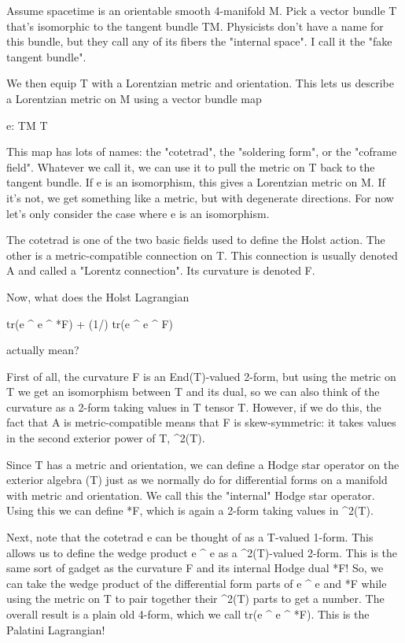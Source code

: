 Assume spacetime is an orientable smooth 4-manifold M.  Pick a vector
bundle T that's isomorphic to the tangent bundle TM.  Physicists don't
have a name for this bundle, but they call any of its fibers the
"internal space".  I call it the "fake tangent bundle".

We then equip T with a Lorentzian metric and orientation.  This lets
us describe a Lorentzian metric on M using a vector bundle map

e: TM \to  T  

This map has lots of names: the "cotetrad", the
"soldering form", or the "coframe field".
Whatever we call it, we can use it to pull the metric on T back to the
tangent bundle. If e is an isomorphism, this gives a Lorentzian metric
on M.  If it's not, we get something like a metric, but with
degenerate directions.  For now let's only consider the case where e
is an isomorphism.

The cotetrad is one of the two basic fields used to define the Holst
action.  The other is a metric-compatible connection on T.  This
connection is usually denoted A and called a "Lorentz
connection".  Its curvature is denoted F.

Now, what does the Holst Lagrangian

tr(e ^ e ^ *F) + (1/\gamma ) tr(e ^ e ^ F)

actually mean?  

First of all, the curvature F is an End(T)-valued 2-form, but using
the metric on T we get an isomorphism between T and its dual, so we
can also think of the curvature as a 2-form taking values in T tensor
T. However, if we do this, the fact that A is metric-compatible means
that F is skew-symmetric: it takes values in the second exterior power
of T, \Lambda ^{2}(T).

Since T has a metric and orientation, we can define a Hodge star
operator on the exterior algebra \Lambda (T) just as we normally do for
differential forms on a manifold with metric and orientation.  We call
this the "internal" Hodge star operator.  Using this we can define *F,
which is again a 2-form taking values in \Lambda ^{2}(T).

Next, note that the cotetrad e can be thought of as a T-valued 1-form.
This allows us to define the wedge product e ^ e as a
\Lambda ^{2}(T)-valued 2-form.  This is the same sort of
gadget as the curvature F and its internal Hodge dual *F!  So, we can
take the wedge product of the differential form parts of e ^ e and *F
while using the metric on T to pair together their
\Lambda ^{2}(T) parts to get a number.  The overall result is
a plain old 4-form, which we call tr(e ^ e ^ *F).  This is the
Palatini Lagrangian!

